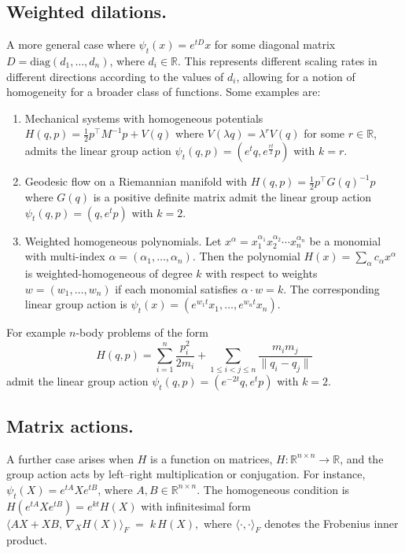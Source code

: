 \documentclass[final,3p,times]{elsarticle}
\newcommand{\R}{\mathbb{R}}
\begin{document}
\subsection{Weighted dilations.} A more general case where $\psi_t(x)=e^{tD}x$ for some diagonal matrix $D=\text{diag}(d_1,\ldots,d_n)$, where $d_i\in\R$. This represents different scaling rates in different directions according to the values of $d_i$, allowing for a notion of homogeneity for a broader class of functions. Some examples are:
\begin{enumerate}
\item Mechanical systems with homogeneous potentials $H(q,p) = \frac{1}{2} p^\top M^{-1} p + V(q)$ where $V(\lambda q) = \lambda^r V(q)$ for some $r\in\R$, admits the linear group action $\psi_t(q,p) = (e^tq, e^{\frac{rt}{2}}p)$ with $k=r$. 
\item Geodesic flow on a Riemannian manifold with $H(q,p) = \frac{1}{2} p^\top G(q)^{-1} p$ where $G(q)$ is a positive definite matrix admit the linear group action $\psi_t(q,p) = (q, e^{t}p)$ with $k=2$.
\item Weighted homogeneous polynomials. Let $x^\alpha = x_1^{\alpha_1} x_2^{\alpha_2} \cdots x_n^{\alpha_n}$ be a monomial with multi-index $\alpha = (\alpha_1,\ldots,\alpha_n)$. Then the polynomial $H(x) = \sum_{\alpha} c_\alpha x^\alpha$ is weighted-homogeneous of degree $k$ with respect to weights $w=(w_1,\ldots,w_n)$ if each monomial satisfies $\alpha\cdot w = k$. The corresponding linear group action is $\psi_t(x) = (e^{w_1 t} x_1, \ldots, e^{w_n t} x_n)$.
\end{enumerate}
For example $n$-body problems of the form 
\begin{equation}
    H(q,p) = \sum_{i=1}^n \frac{p_i^2}{2m_i} + \sum_{1\leq i<j\leq n} \frac{m_im_j}{\|q_i-q_j\|}
\end{equation}
admit the linear group action $\psi_t(q,p) = (e^{-2t}q, e^{t}p)$ with $k=2$. 

\subsection{Matrix actions.} 
A further case arises when $H$ is a function on matrices, $H:\R^{n\times n}\to\R$, and the group action acts by left--right multiplication or conjugation. For instance, $\psi_t(X) = e^{tA} X e^{tB}$, where $A,B \in \R^{n\times n}.$ The homogeneous condition is $H(e^{tA} X e^{tB}) = e^{k t} H(X)$ with infinitesimal form $\langle AX + X B ,\,\nabla_X H(X) \rangle_F \;=\; k\,H(X),$ where $\langle\cdot,\cdot\rangle_F$ denotes the Frobenius inner product. 
\end{document}
